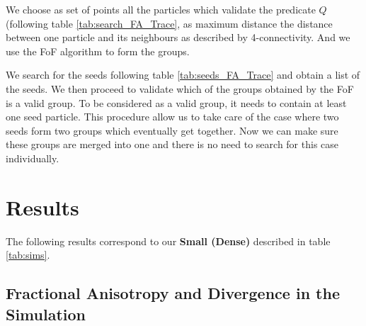 \documentclass[12pt]{article}
\begin{document}
\begin{par}
We choose as set of points all the
particles which validate the predicate $Q$ (following table
\ref{tab:search_FA_Trace}, as maximum distance the distance
between one particle and its neighbours as described by
4-connectivity. And we use the FoF algorithm to form the groups. 
\end{par}
\begin{par}
We search for the seeds following table \ref{tab:seeds_FA_Trace}
and obtain a list of the seeds. We then proceed to validate which
of the groups obtained by the FoF is a valid group. To be
considered as a valid group, it needs to contain at least one seed
particle. This procedure allow us to take care of the case where
two seeds form two groups which eventually get together. Now we
can make sure these groups are merged into one and there is no
need to search for this case individually.
\end{par}


\section{Results}

The following results correspond to our
 \textbf{Small (Dense)} described in table
  \ref{tab:sims}.
  
\subsection{Fractional Anisotropy and Divergence in the Simulation}
\end{document}
